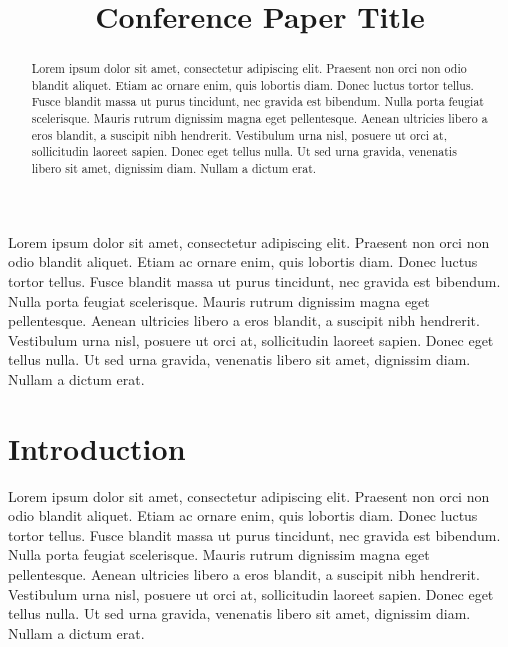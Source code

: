 \documentclass[conference]{IEEEtran}
\begin{document}
\title{Conference Paper Title}

\author{
\and
{}
}

\maketitle

\begin{abstract}
Lorem ipsum dolor sit amet, consectetur adipiscing elit. Praesent non orci non odio blandit aliquet. Etiam ac ornare enim, quis lobortis diam. Donec luctus tortor tellus. Fusce blandit massa ut purus tincidunt, nec gravida est bibendum. Nulla porta feugiat scelerisque. Mauris rutrum dignissim magna eget pellentesque. Aenean ultricies libero a eros blandit, a suscipit nibh hendrerit. Vestibulum urna nisl, posuere ut orci at, sollicitudin laoreet sapien. Donec eget tellus nulla. Ut sed urna gravida, venenatis libero sit amet, dignissim diam. Nullam a dictum erat.
\end{abstract}

\begin{IEEEkeywords}
Lorem ipsum dolor sit amet, consectetur adipiscing elit. Praesent non orci non odio blandit aliquet. Etiam ac ornare enim, quis lobortis diam. Donec luctus tortor tellus. Fusce blandit massa ut purus tincidunt, nec gravida est bibendum. Nulla porta feugiat scelerisque. Mauris rutrum dignissim magna eget pellentesque. Aenean ultricies libero a eros blandit, a suscipit nibh hendrerit. Vestibulum urna nisl, posuere ut orci at, sollicitudin laoreet sapien. Donec eget tellus nulla. Ut sed urna gravida, venenatis libero sit amet, dignissim diam. Nullam a dictum erat.
\end{IEEEkeywords}

\section{Introduction}
Lorem ipsum dolor sit amet, consectetur adipiscing elit. Praesent non orci non odio blandit aliquet. Etiam ac ornare enim, quis lobortis diam. Donec luctus tortor tellus. Fusce blandit massa ut purus tincidunt, nec gravida est bibendum. Nulla porta feugiat scelerisque. Mauris rutrum dignissim magna eget pellentesque. Aenean ultricies libero a eros blandit, a suscipit nibh hendrerit. Vestibulum urna nisl, posuere ut orci at, sollicitudin laoreet sapien. Donec eget tellus nulla. Ut sed urna gravida, venenatis libero sit amet, dignissim diam. Nullam a dictum erat.
\end{document}
